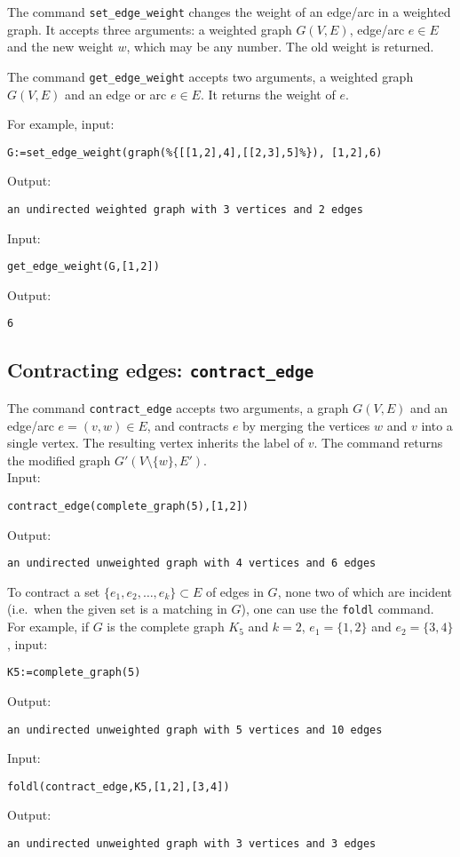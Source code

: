 \documentclass[a4paper,11pt]{article}
\begin{document}
The command {\tt set\_edge\_weight} changes the weight of an edge/arc in a weighted graph. It accepts three arguments: a weighted graph $ G(V,E) $, edge/arc $ e\in E $ and the new weight $ w $, which may be any number. The old weight is returned.

The command {\tt get\_edge\_weight} accepts two arguments, a weighted graph $ G(V,E) $ and an edge or arc $ e\in E $. It returns the weight of $ e $.

For example, input:
\begin{center}
  \tt G:=set\_edge\_weight(graph(\%\{[[1,2],4],[[2,3],5]\%\}), [1,2],6)
\end{center}
Output:
\begin{center}
  \tt an undirected weighted graph with 3 vertices and 2 edges
\end{center}
Input:
\begin{center}
  \tt get\_edge\_weight(G,[1,2])
\end{center}
Output:
\begin{center}
  \tt 6
\end{center}

\subsection{Contracting edges: {\tt contract\_edge}}

The command {\tt contract\_edge} accepts two arguments, a graph $ G(V,E) $ and an edge/arc $ e=(v,w)\in E $, and contracts $ e $ by merging the vertices $ w $ and $ v $ into a single vertex. The resulting vertex inherits the label of $ v $. The command returns the modified graph $ G'(V\setminus\{w\},E') $.\\
Input:
\begin{center}
  \tt contract\_edge(complete\_graph(5),[1,2])
\end{center}
Output:
\begin{center}
  \tt an undirected unweighted graph with 4 vertices and 6 edges
\end{center}

To contract a set $ \{e_1,e_2,\dots,e_k\}\subset E $ of edges in $ G $, none two of which are incident (i.e.~when the given set is a matching in $ G $), one can use the {\tt foldl} command. For example, if $ G $ is the complete graph $ K_5 $ and $ k=2 $, $ e_1=\{1,2\} $ and $ e_2=\{3,4\} $, input:
\begin{center}
  \tt K5:=complete\_graph(5)
\end{center}
Output:
\begin{center}
  \tt an undirected unweighted graph with 5 vertices and 10 edges
\end{center}
Input:
\begin{center}
  \tt foldl(contract\_edge,K5,[1,2],[3,4])
\end{center}
Output:
\begin{center}
  \tt an undirected unweighted graph with 3 vertices and 3 edges
\end{center}
\end{document}
